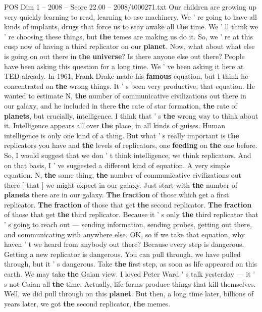 \begin{textsample}{POS Dim 1 – 2008 – Score 22.00 – 2008/t000271.txt}
Our children are growing up very quickly learning to read, learning to use machinery.
We ' re going to have all kinds of implants, drugs that force us to stay awake all \textbf{the} time.
We ' ll think we ' re choosing these things, but \textbf{the} temes are making us do it.
So, we ' re at this cusp now of having a third replicator on our \textbf{planet}.
Now, what about what else is going on out there in \textbf{the} \textbf{universe}?
Is there anyone else out there?
People have been asking this question for a long time.
We ' ve been asking it here at TED already.
In 1961, Frank Drake made his \textbf{famous} equation, but I think he concentrated on \textbf{the} wrong things.
It ' s been very productive, that equation.
He wanted to estimate N, \textbf{the} number of communicative civilizations out there in our galaxy, and he included in there \textbf{the} rate of star formation, \textbf{the} rate of \textbf{planets}, but crucially, intelligence.
I think that ' s \textbf{the} wrong way to think about it.
Intelligence appears all over \textbf{the} place, in all kinds of guises.
Human intelligence is only one kind of a thing.
But what ' s really important is \textbf{the} replicators you have and \textbf{the} levels of replicators, one \textbf{feeding} on \textbf{the} one before.
So, I would suggest that we don ' t think intelligence, we think replicators.
And on that basis, I ' ve suggested a different kind of equation.
A very simple equation.
N, \textbf{the} same thing, \textbf{the} number of communicative civilizations out there [ that ] we might expect in our galaxy.
Just start with \textbf{the} number of \textbf{planets} there are in our galaxy. \textbf{The} \textbf{fraction} of those which get a first replicator. \textbf{The} \textbf{fraction} of those that get \textbf{the} second replicator. \textbf{The} \textbf{fraction} of those that get \textbf{the} third replicator.
Because it ' s only \textbf{the} third replicator that ' s going to reach out — sending information, sending probes, getting out there, and communicating with anywhere else.
OK, so if we take that equation, why haven ' t we heard from anybody out there?
Because every step is dangerous.
Getting a new replicator is dangerous.
You can pull through, we have pulled through, but it ' s dangerous.
Take \textbf{the} first step, as soon as life appeared on this earth.
We may take \textbf{the} Gaian view.
I loved Peter Ward ' s talk yesterday — it ' s not Gaian all \textbf{the} time.
Actually, life forms produce things that kill themselves.
Well, we did pull through on this \textbf{planet}.
But then, a long time later, billions of years later, we got \textbf{the} second replicator, \textbf{the} memes.

\end{textsample}

